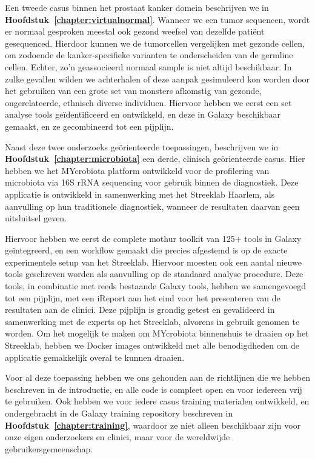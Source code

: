 Een tweede casus binnen het prostaat kanker domein beschrijven we in \textbf{Hoofdstuk~\ref{chapter:virtualnormal}}. Wanneer we een tumor sequencen, wordt er normaal gesproken meestal ook gezond weefsel van dezelfde patiënt gesequenced.
Hierdoor kunnen we de tumorcellen vergelijken met gezonde cellen, om zodoende de kanker-specifieke varianten te onderscheiden van de germline cellen.
Echter, zo'n geassocieerd normaal sample is niet altijd beschikbaar.
In zulke gevallen wilden we achterhalen of deze aanpak gesimuleerd kon worden door het gebruiken van een grote set van monsters afkomstig van gezonde, ongerelateerde, ethnisch diverse individuen.
Hiervoor hebben we eerst een set analyse tools geïdentificeerd en ontwikkeld, en deze in Galaxy beschikbaar gemaakt, en ze gecombineerd tot een pijplijn.

Naast deze twee onderzoeks geörienteerde toepassingen, beschrijven we in \textbf{Hoofdstuk~\ref{chapter:microbiota}} een derde, clinisch geörienteerde casus. Hier hebben we het MYcrobiota platform ontwikkeld voor de profilering van microbiota via 16S rRNA sequencing voor gebruik binnen de diagnostiek.
Deze applicatie is ontwikkeld in samenwerking met het Streeklab Haarlem, als aanvulling op hun traditionele diagnostiek, wanneer de resultaten daarvan geen uitsluitsel geven.

Hiervoor hebben we eerst de complete mothur toolkit van 125+ tools in Galaxy geïntegreerd, en een workflow gemaakt die precies afgestemd is op de exacte experimentele setup van het Streeklab.
Hiervoor moesten ook een aantal nieuwe tools geschreven worden als aanvulling op de standaard analyse procedure.
Deze tools, in combinatie met reeds bestaande Galaxy tools, hebben we samengevoegd tot een pijplijn, met een iReport aan het eind voor het presenteren van de resultaten aan de clinici.
Deze pijplijn is grondig getest en gevalideerd in samenwerking met de experts op het Streeklab, alvorens in gebruik genomen te worden.
Om het mogelijk te maken om MYcrobiota binnenshuis te draaien op het Streeklab, hebben we Docker images ontwikkeld met alle benodigdheden om de applicatie gemakkelijk overal te kunnen draaien.

Voor al deze toepassing hebben we ons gehouden aan de richtlijnen die we hebben beschreven in de introductie, en alle code is compleet open en voor iedereen vrij te gebruiken. Ook hebben we voor iedere casus training materialen ontwikkeld, en ondergebracht in de Galaxy training repository beschreven in \textbf{Hoofdstuk~\ref{chapter:training}}, waardoor ze niet alleen beschikbaar zijn voor onze eigen onderzoekers en clinici, maar voor de wereldwijde gebruikersgemeenschap.


